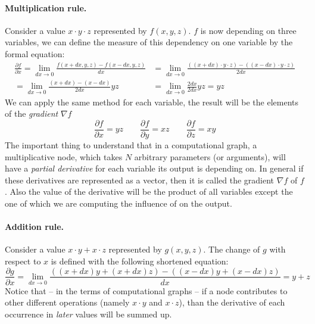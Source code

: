 \paragraph{Multiplication rule.}
Consider a value $x\cdot y \cdot z$ represented by $f(x,y,z)$. $f$ is now depending on three variables, we can define the measure of this dependency on one variable by the formal equation:
\begin{equation*}
\begin{split}
    \frac{\partial f}{\partial x} = \lim_{dx\rightarrow 0} \frac{f(x+dx,y,z)-f(x-dx,y,z)}{dx}
    &= \lim_{dx\rightarrow 0} \frac{((x+dx)\cdot y \cdot z)-((x-dx)\cdot y \cdot z)}{2dx} \\
    = \lim_{dx\rightarrow 0} \frac{(x+dx)-(x-dx)}{2dx} y z&= \lim_{dx\rightarrow 0} \frac{2dx}{2dx} yz= yz
\end{split}
\end{equation*}
We can apply the same method for each variable, the result will be the elements of the \emph{gradient} $\nabla f$
\begin{equation}\label{eq:multiplication}
    \frac{\partial f}{\partial x} = y z \qquad
    \frac{\partial f}{\partial y} = x z \qquad
    \frac{\partial f}{\partial z} = x y 
\end{equation} 
The important thing to understand that in a computational graph, a multiplicative node, which takes $N$ arbitrary parameters (or arguments), will have a \emph{partial derivative} for each variable its output is depending on. In general if these derivatives are represented as a vector, then it is called the gradient $\nabla f$ of $f$. Also the value of the derivative will be the product of all variables except the one of which we are computing the influence of on the output.

\paragraph{Addition rule.}
Consider a value $x\cdot y + x\cdot z$ represented by $g(x,y,z)$.
The change of $g$ with respect to $x$ is defined with the following shortened equation:
\begin{equation}\label{eq:addition}
    \frac{\partial g}{\partial x} = \lim_{dx\rightarrow 0} \frac{((x+dx)y +(x+dx)z)-((x-dx)y +(x-dx)z)}{dx}=y+z
\end{equation}
Notice that -- in the terms of computational graphs -- if a node contributes to other different operations (namely $x\cdot y$ and $x\cdot z$), 
than the derivative of each occurrence in \emph{later} values will be summed up. 

